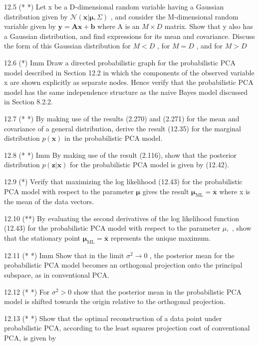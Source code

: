 \documentclass[
  10
]{article}
\begin{document}
12.5 (* *) Let x be a D-dimensional random variable having a Gaussian
distribution given by
\(\mathcal { N } ( \mathbf { x } | \boldsymbol { \mu } , \Sigma )\) ,
and consider the M-dimensional random variable given by
\(\mathbf { y } = \mathbf { A x } + \mathbf { b }\) where A is an
\(M \times D\) matrix. Show that y also has a Gaussian distribution, and
find expressions for its mean and covariance. Discuss the form of this
Gaussian distribution for \(M < D\) , for \(M = D\) , and for \(M > D\)

12.6 (*) Imm Draw a directed probabilistic graph for the probabilistic
PCA model described in Section 12.2 in which the components of the
observed variable x are shown explicitly as separate nodes. Hence verify
that the probabilistic PCA model has the same independence structure as
the naive Bayes model discussed in Section 8.2.2.

12.7 (* *) By making use of the results (2.270) and (2.271) for the mean
and covariance of a general distribution, derive the result (12.35) for
the marginal distribution \(p ( \mathbf { x } )\) in the probabilistic
PCA model.

12.8 (* *) Imm By making use of the result (2.116), show that the
posterior distribution \(p ( \mathbf { z } | \mathbf { x } )\) for the
probabilistic PCA model is given by (12.42).

12.9 (*) Verify that maximizing the log likelihood (12.43) for the
probabilistic PCA model with respect to the parameter \(\pmb { \mu }\)
gives the result
\(\pmb { \mu } _ { \mathrm { M L } } = \overline { { \mathbf { x } } }\)
where x is the mean of the data vectors.

12.10 (**) By evaluating the second derivatives of the log likelihood
function (12.43) for the probabilistic PCA model with respect to the
parameter \(\mu ,\) , show that the stationary point
\(\pmb { \mu } _ { \mathrm { M L } } = \overline { { \mathbf { x } } }\)
represents the unique maximum.

12.11 (* *) Imm Show that in the limit \(\sigma ^ { 2 } \to 0\) , the
posterior mean for the probabilistic PCA model becomes an orthogonal
projection onto the principal subspace, as in conventional PCA.

12.12 (* *) For \(\sigma ^ { 2 } > 0\) show that the posterior mean in
the probabilistic PCA model is shifted towards the origin relative to
the orthogonal projection.

12.13 (* *) Show that the optimal reconstruction of a data point under
probabilistic PCA, according to the least squares projection cost of
conventional PCA, is given by
\end{document}
